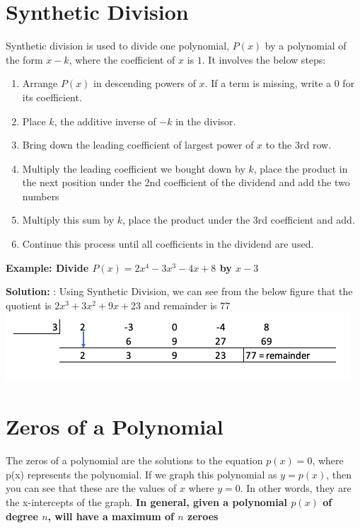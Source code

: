 \documentclass{book}
\begin{document}
	\section{Synthetic Division}
	Synthetic division is used to divide one polynomial, $P(x)$ by a polynomial of the form $x-k$, where the coefficient of $x$ is $1$. It involves the below steps:
	\begin{enumerate}
		\item Arrange $P(x)$ in descending powers of $x$. If a term is missing, write a $0$ for its coefficient.
		\item Place $k$, the additive inverse of $-k$ in the divisor.
		\item Bring down the leading coefficient of largest power of $x$ to the 3rd row.
		\item Multiply the leading coefficient we bought down by $k$, place the product in the next position under the 2nd coefficient of the dividend and add the two numbers
		\item Multiply this sum by $k$, place the product under the 3rd coefficient and add.
		\item Continue this process until all coefficients in the dividend are used.
	\end{enumerate}

\begin{mdframed}[backgroundcolor=yellow]
	\textbf{Example: Divide $P(x) = 2x^4 - 3x^3 -4x + 8$ by $x-3$}
\end{mdframed}
\textbf{Solution: } : Using Synthetic Division, we can see from the below figure that the quotient is $2x^3 + 3x^2 + 9x + 23$ and remainder is $77$ \\

\includegraphics[scale=0.7, width=\linewidth, frame]{sdivision}

	\section{Zeros of a Polynomial}
	
	\begin{mdframed}[backgroundcolor=yellow]
		The zeros of a polynomial are the solutions to the equation $p(x) = 0$, where p(x) represents the polynomial. If we graph this polynomial as $y = p(x)$, then you can see that these are the values of $x$ where $y = 0$. In other words, they are the x-intercepts of the graph.
		\textbf{In general, given a polynomial $p(x)$ of degree $n$, will have a maximum of $n$ zeroes}
	\end{mdframed}
\end{document}
